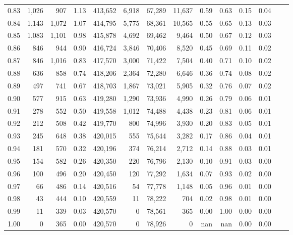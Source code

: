 \begin{tabular}{rrrrrrrrrrrrrr}
0.83 &  1,026 &    907 &     1.13 &  413,652 &    6,918 &  67,289 &  11,637 &  0.59 &  0.63 &  0.15 &      0.04 \\
0.84 &  1,143 &  1,072 &     1.07 &  414,795 &    5,775 &  68,361 &  10,565 &  0.55 &  0.65 &  0.13 &      0.03 \\
0.85 &  1,083 &  1,101 &     0.98 &  415,878 &    4,692 &  69,462 &   9,464 &  0.50 &  0.67 &  0.12 &      0.03 \\
0.86 &    846 &    944 &     0.90 &  416,724 &    3,846 &  70,406 &   8,520 &  0.45 &  0.69 &  0.11 &      0.02 \\
0.87 &    846 &  1,016 &     0.83 &  417,570 &    3,000 &  71,422 &   7,504 &  0.40 &  0.71 &  0.10 &      0.02 \\
0.88 &    636 &    858 &     0.74 &  418,206 &    2,364 &  72,280 &   6,646 &  0.36 &  0.74 &  0.08 &      0.02 \\
0.89 &    497 &    741 &     0.67 &  418,703 &    1,867 &  73,021 &   5,905 &  0.32 &  0.76 &  0.07 &      0.02 \\
0.90 &    577 &    915 &     0.63 &  419,280 &    1,290 &  73,936 &   4,990 &  0.26 &  0.79 &  0.06 &      0.01 \\
0.91 &    278 &    552 &     0.50 &  419,558 &    1,012 &  74,488 &   4,438 &  0.23 &  0.81 &  0.06 &      0.01 \\
0.92 &    212 &    508 &     0.42 &  419,770 &      800 &  74,996 &   3,930 &  0.20 &  0.83 &  0.05 &      0.01 \\
0.93 &    245 &    648 &     0.38 &  420,015 &      555 &  75,644 &   3,282 &  0.17 &  0.86 &  0.04 &      0.01 \\
0.94 &    181 &    570 &     0.32 &  420,196 &      374 &  76,214 &   2,712 &  0.14 &  0.88 &  0.03 &      0.01 \\
0.95 &    154 &    582 &     0.26 &  420,350 &      220 &  76,796 &   2,130 &  0.10 &  0.91 &  0.03 &      0.00 \\
0.96 &    100 &    496 &     0.20 &  420,450 &      120 &  77,292 &   1,634 &  0.07 &  0.93 &  0.02 &      0.00 \\
0.97 &     66 &    486 &     0.14 &  420,516 &       54 &  77,778 &   1,148 &  0.05 &  0.96 &  0.01 &      0.00 \\
0.98 &     43 &    444 &     0.10 &  420,559 &       11 &  78,222 &     704 &  0.02 &  0.98 &  0.01 &      0.00 \\
0.99 &     11 &    339 &     0.03 &  420,570 &        0 &  78,561 &     365 &  0.00 &  1.00 &  0.00 &      0.00 \\
1.00 &      0 &    365 &     0.00 &  420,570 &        0 &  78,926 &       0 &   nan &   nan &  0.00 &      0.00 \\
\bottomrule
\end{tabular}
